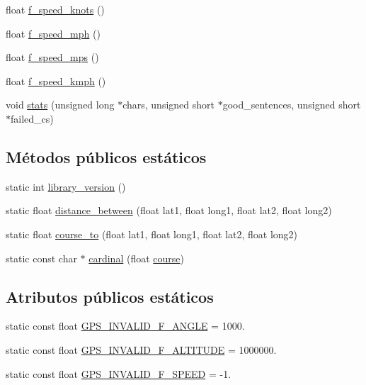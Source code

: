 \begin{DoxyCompactItemize}
float \hyperlink{class_tiny_g_p_s_a176ace2182d5129f3f4fa4d22ee905fb}{f\+\_\+speed\+\_\+knots} ()
\item 
float \hyperlink{class_tiny_g_p_s_a7c3c51c4df168ef2b1583a86d8deff34}{f\+\_\+speed\+\_\+mph} ()
\item 
float \hyperlink{class_tiny_g_p_s_a50bf6df367912942e294de13170cb1e0}{f\+\_\+speed\+\_\+mps} ()
\item 
float \hyperlink{class_tiny_g_p_s_a9cfc388eba14bd0d833958970b68763c}{f\+\_\+speed\+\_\+kmph} ()
\item 
void \hyperlink{class_tiny_g_p_s_a12cb37c1f14fd784558932a1bc572bbb}{stats} (unsigned long $\ast$chars, unsigned short $\ast$good\+\_\+sentences, unsigned short $\ast$failed\+\_\+cs)
\end{DoxyCompactItemize}
\subsection*{Métodos públicos estáticos}
\begin{DoxyCompactItemize}
\item 
static int \hyperlink{class_tiny_g_p_s_a50ef8dcc83a2f05ad9f1a64f5f2495be}{library\+\_\+version} ()
\item 
static float \hyperlink{class_tiny_g_p_s_a5280f59c83069e5113d85d82a1f2b510}{distance\+\_\+between} (float lat1, float long1, float lat2, float long2)
\item 
static float \hyperlink{class_tiny_g_p_s_a0655fb2ba390b299252c09779f4472fb}{course\+\_\+to} (float lat1, float long1, float lat2, float long2)
\item 
static const char $\ast$ \hyperlink{class_tiny_g_p_s_a8aeef91f9559578d0a0fbc7482adcb17}{cardinal} (float \hyperlink{class_tiny_g_p_s_adbc4a27bc7a804b3f967b15b6091d715}{course})
\end{DoxyCompactItemize}
\subsection*{Atributos públicos estáticos}
\begin{DoxyCompactItemize}
\item 
static const float \hyperlink{class_tiny_g_p_s_a401ec11086980f528e2f764bf781921a}{G\+P\+S\+\_\+\+I\+N\+V\+A\+L\+I\+D\+\_\+\+F\+\_\+\+A\+N\+G\+LE} = 1000.
\item 
static const float \hyperlink{class_tiny_g_p_s_aac690d54d26195fd0c3b0bad517ee30c}{G\+P\+S\+\_\+\+I\+N\+V\+A\+L\+I\+D\+\_\+\+F\+\_\+\+A\+L\+T\+I\+T\+U\+DE} = 1000000.
\item 
static const float \hyperlink{class_tiny_g_p_s_a6cc8eac7258e9263665fabaa03380f97}{G\+P\+S\+\_\+\+I\+N\+V\+A\+L\+I\+D\+\_\+\+F\+\_\+\+S\+P\+E\+ED} = -\/1.
\end{DoxyCompactItemize}


